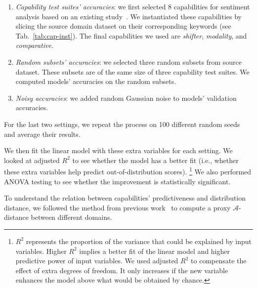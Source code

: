 \documentclass{article}
\begin{document}
\begin{enumerate}
    \item \textit{Capability test suites' accuracies}: we first selected 8 capabilities for sentiment analysis based on an existing study~\cite{barnes-etal-2019-sentiment}. We instantiated these capabilities by slicing the source domain dataset on their corresponding keywords (see Tab.~\ref{tab:cap-inst}).
    The final capabilities we used are \textit{shifter}, \textit{modality}, and \textit{comparative}.
    \item \textit{Random subsets' accuracies}: we selected three random subsets from source dataset. These subsets are of the same size of three capability test suites. We computed models' accuracies on the random subsets.
    \item \textit{Noisy accuracies}:  we added random Gaussian noise to models' validation accuracies.
\end{enumerate}

For the last two settings, we repeat the process on 100 different random seeds and average their results.

We then fit the linear model with these extra variables for each setting.
We looked at adjusted $R^2$ to see whether the model has a better fit (i.e., whether these extra variables help predict out-of-distribution scores). 
\footnote{$R^2$ represents the proportion of the variance that could be explained by input variables. 
Higher $R^2$ implies a better fit of the linear model and higher predictive power of input variables.
We used adjusted $R^2$ to compensate the effect of extra degrees of freedom. It only increases if the new variable enhances the model above what would be obtained by chance.}
We also performed \textsc{ANOVA} testing to see whether the improvement is statistically significant. 

To understand the relation between capabilities' predictiveness and distribution distance, we followed the method from previous work~\cite{blitzer-etal-2007-biographies} to compute a proxy $\mathcal{A}$-distance between different domains.

\end{document}
